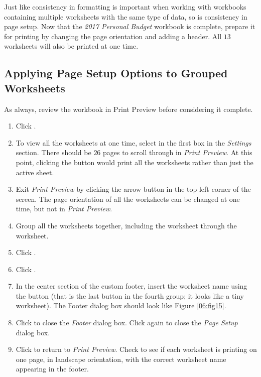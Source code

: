 Just like consistency in formatting is important when working with workbooks containing multiple worksheets with the same type of data, so is consistency in page setup. Now that the \textit{2017 Personal Budget} workbook is complete, prepare it for printing by changing the page orientation and adding a header. All $ 13 $ worksheets will also be printed at one time.

\subsection{Applying Page Setup Options to Grouped Worksheets}

As always, review the workbook in Print Preview before considering it complete.
\begin{enumerate}
	\item Click .
	\item To view all the worksheets at one time, select  in the first box in the \textit{Settings} section. There should be $ 26 $ pages to scroll through in \textit{Print Preview}. At this point, clicking the  button would print all the worksheets rather than just the active sheet.
	\item Exit \textit{Print Preview} by clicking the arrow button in the top left corner of the screen. The page orientation of all the worksheets can be changed at one time, but not in \textit{Print Preview}.
	\item Group all the worksheets together, including the  worksheet through the  worksheet.
	\item Click .
	\item Click .
	\item In the center section of the custom footer, insert the worksheet name using the  button (that is the last button in the fourth group; it looks like a tiny worksheet). The Footer dialog box should look like Figure \ref{06:fig15}.
	\item Click  to close the \textit{Footer} dialog box. Click  again to close the \textit{Page Setup} dialog box.
	\item Click  to return to \textit{Print Preview}. Check to see if each worksheet is printing on one page, in landscape orientation, with the correct worksheet name appearing in the footer.
\end{enumerate}

